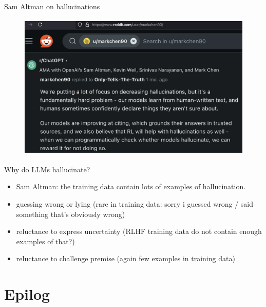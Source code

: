 \begin{vbframe}{Sam Altman on hallucinations}
\begin{figure}
\centering
\includegraphics[height = 7cm]{figure/altman,halluciation}
\end{figure}
\vfill
\end{vbframe}

\begin{vbframe}{Why do LLMs hallucinate?}

\vfill


	\begin{itemize}


\item Sam Altman: the training data contain lots of examples
of hallucination.
       
\item guessing wrong or lying (rare in training data: sorry
i guessed wrong / said something that's obviously wrong)

\item reluctance to express uncertainty (RLHF training data
do not contain enough examples of that?)

\item reluctance to challenge premise (again few examples in
training data)


\end{itemize}

\vfill

\end{vbframe}





\section{Epilog}






